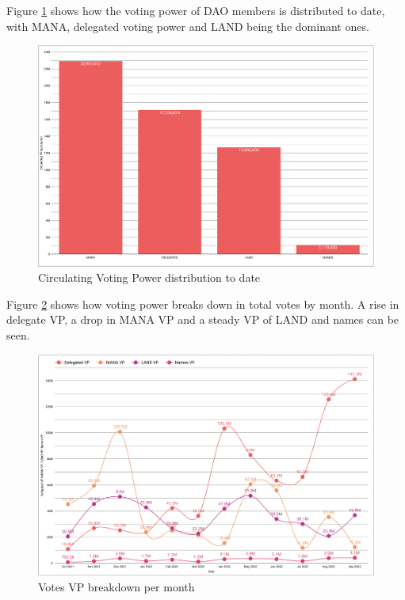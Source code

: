 \documentclass[MSE,Master,english]{twbook}%
\begin{document}
Figure \ref{fig:vp_distribution} shows how the voting power of DAO members is distributed to date, with MANA, delegated voting power and LAND being the dominant ones.
\begin{figure}[H]
  \centering
  \includegraphics[width=\textwidth]{metrics/vp_distribution.png}
  \caption{Circulating Voting Power distribution to date}
  \label{fig:vp_distribution}
\end{figure}

Figure \ref{fig:votes_vp} shows how voting power breaks down in total votes by month. A rise in delegate VP, a drop in MANA VP and a steady VP of LAND and names can be seen.
\begin{figure}[H]
  \centering
  \includegraphics[width=\textwidth]{metrics/votes_breakdown.png}
  \caption{Votes VP breakdown per month}
  \label{fig:votes_vp}
\end{figure}
\end{document}
